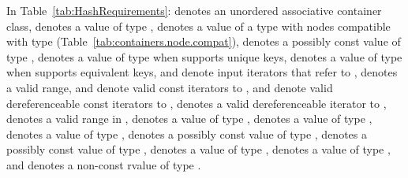\pnum
{}%
%
%
%
%
%
In Table~\ref{tab:HashRequirements}:
 denotes an unordered associative container class,
 denotes a value of type ,
 denotes a value of a type with nodes compatible with type
 (Table~\ref{tab:containers.node.compat}),
 denotes a possibly const value of type ,
 denotes a value of type  when  supports unique keys,
 denotes a value of type  when  supports equivalent keys,
 and  denote input iterators that refer to ,
\tcode{[i, j)} denotes a valid range,
 and  denote valid const iterators to ,
 and  denote valid dereferenceable const iterators to ,
 denotes a valid dereferenceable iterator to ,
\tcode{[q1, q2)} denotes a valid range in ,
 denotes a value of type ,
 denotes a value of type ,
 denotes a value of type ,
 denotes a possibly const value of type ,
 denotes a possibly const value of type ,
 denotes a value of type ,
 denotes a value of type ,
and  denotes a non-const rvalue of type .

